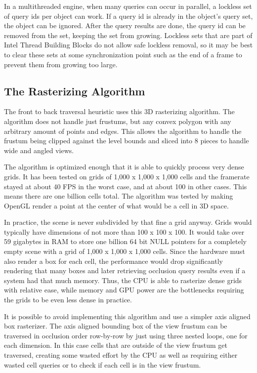 \documentclass[12pt]{ucthesis}
\begin{document}
In a multithreaded engine, when many queries can occur in parallel, a lockless set of query ids per object can work.
If a query id is already in the object's query set, the object can be ignored.
After the query results are done, the query id can be removed from the set, keeping the set from growing.
Lockless sets that are part of Intel Thread Building Blocks do not allow safe lockless removal, so it may be best to clear these sets at some synchronization point such as the end of a frame to prevent them from growing too large.\cite{tbb}

\subsection{The Rasterizing Algorithm}
\label{the-rasterizing-algorithm}
The front to back traversal heuristic uses this 3D rasterizing algorithm. 
The algorithm does not handle just frustums, but any convex polygon with any arbitrary amount of points and edges.
This allows the algorithm to handle the frustum being clipped against the level bounds and sliced into 8 pieces to handle wide and angled views.

The algorithm is optimized enough that it is able to quickly process very dense grids.
It has been tested on grids of 1,000 x 1,000 x 1,000 cells and the framerate stayed at about 40 FPS in the worst case, and at about 100 in other cases.
This means there are one billion cells total.
The algorithm was tested by making OpenGL render a point at the center of what would be a cell in 3D space.

In practice, the scene is never subdivided by that fine a grid anyway.
Grids would typically have dimensions of not more than 100 x 100 x 100.
It would take over 59 gigabytes in RAM to store one billion 64 bit NULL pointers for a completely empty scene with a grid of 1,000 x 1,000 x 1,000 cells.
Since the hardware must also render a box for each cell, the performance would drop significantly rendering that many boxes and later retrieving occlusion query results even if a system had that much memory.
Thus, the CPU is able to rasterize dense grids with relative ease, while memory and GPU power are the bottlenecks requiring the grids to be even less dense in practice.

It is possible to avoid implementing this algorithm and use a simpler axis aligned box rasterizer.
The axis aligned bounding box of the view frustum can be traversed in occlusion order row-by-row by just using three nested loops, one for each dimension.
In this case cells that are outside of the view frustum get traversed, creating some wasted effort by the CPU as well as requiring either wasted cell queries or to check if each cell is in the view frustum.
\end{document}
